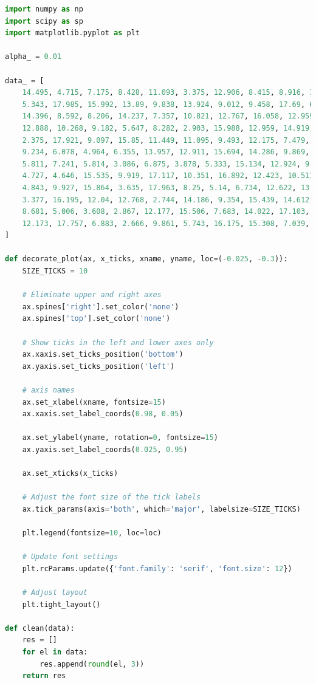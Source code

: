 \documentclass[a4paper, 14pt]{extarticle}
\begin{document}
\begin{center}
    \begin{lstlisting}[language=Python]
import numpy as np
import scipy as sp
import matplotlib.pyplot as plt

alpha_ = 0.01

data_ = [
    14.495, 4.715, 7.175, 8.428, 11.093, 3.375, 12.906, 8.415, 8.916, 13.48,
    5.343, 17.985, 15.992, 13.89, 9.838, 13.924, 9.012, 9.458, 17.69, 6.542,
    14.396, 8.592, 8.206, 14.237, 7.357, 10.821, 12.767, 16.058, 12.959, 4.354,
    12.888, 10.268, 9.182, 5.647, 8.282, 2.903, 15.988, 12.959, 14.919, 6.339,
    2.375, 17.921, 9.097, 15.85, 11.449, 11.095, 9.493, 12.175, 7.479, 13.535,
    9.234, 6.078, 4.964, 6.355, 13.957, 12.911, 15.694, 14.286, 9.869, 5.175,
    5.811, 7.241, 5.814, 3.086, 6.875, 3.878, 5.333, 15.134, 12.924, 9.159,
    4.727, 4.646, 15.535, 9.919, 17.117, 10.351, 16.892, 12.423, 10.511, 4.942,
    4.843, 9.927, 15.864, 3.635, 17.963, 8.25, 5.14, 6.734, 12.622, 13.325,
    3.377, 16.195, 12.04, 12.768, 2.744, 14.186, 9.354, 15.439, 14.612, 15.649,
    8.681, 5.006, 3.608, 2.867, 12.177, 15.506, 7.683, 14.022, 17.103, 8.905,
    12.173, 17.757, 6.883, 2.666, 9.861, 5.743, 16.175, 15.308, 7.039, 15.238
]

def decorate_plot(ax, x_ticks, xname, yname, loc=(-0.025, -0.3)):
    SIZE_TICKS = 10

    # Eliminate upper and right axes
    ax.spines['right'].set_color('none')
    ax.spines['top'].set_color('none')

    # Show ticks in the left and lower axes only
    ax.xaxis.set_ticks_position('bottom')
    ax.yaxis.set_ticks_position('left')

    # axis names
    ax.set_xlabel(xname, fontsize=15)
    ax.xaxis.set_label_coords(0.98, 0.05)

    ax.set_ylabel(yname, rotation=0, fontsize=15)
    ax.yaxis.set_label_coords(0.025, 0.95)

    ax.set_xticks(x_ticks)

    # Adjust the font size of the tick labels
    ax.tick_params(axis='both', which='major', labelsize=SIZE_TICKS)

    plt.legend(fontsize=10, loc=loc)

    # Update font settings
    plt.rcParams.update({'font.family': 'serif', 'font.size': 12})

    # Adjust layout
    plt.tight_layout()

def clean(data):
    res = []
    for el in data:
        res.append(round(el, 3))
    return res


\end{lstlisting}
\end{center}
\end{document}
